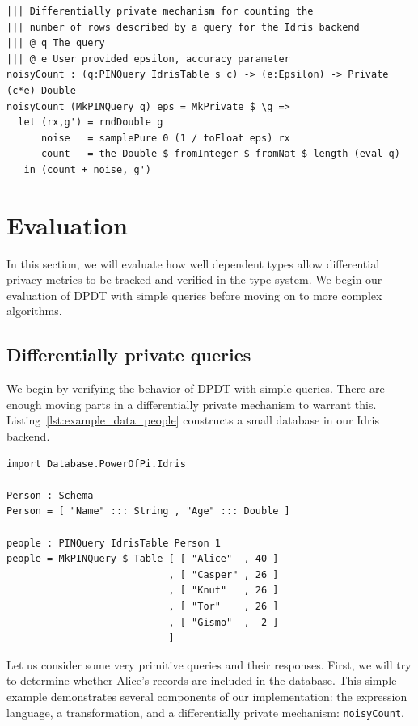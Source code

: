 \documentclass[12pt]{article}
\begin{document}
\begin{lstlisting}[caption={Representing aggregations},label={lst:aggregations}]
||| Differentially private mechanism for counting the
||| number of rows described by a query for the Idris backend
||| @ q The query
||| @ e User provided epsilon, accuracy parameter
noisyCount : (q:PINQuery IdrisTable s c) -> (e:Epsilon) -> Private (c*e) Double
noisyCount (MkPINQuery q) eps = MkPrivate $ \g =>
  let (rx,g') = rndDouble g
      noise   = samplePure 0 (1 / toFloat eps) rx
      count   = the Double $ fromInteger $ fromNat $ length (eval q)
   in (count + noise, g')
\end{lstlisting}

\section{Evaluation}\label{sec:evaluation}

In this section, we will evaluate how well dependent types allow differential privacy metrics to be tracked and verified in the type system.
We begin our evaluation of DPDT with simple queries before moving on to more complex algorithms.

\subsection{Differentially private queries}

We begin by verifying the behavior of DPDT with simple queries.
There are enough moving parts in a differentially private mechanism to warrant this.
Listing~\ref{lst:example_data_people} constructs a small database in our Idris backend.

\begin{lstlisting}[caption={Validation Data},label={lst:example_data_people}]
import Database.PowerOfPi.Idris

Person : Schema
Person = [ "Name" ::: String , "Age" ::: Double ]

people : PINQuery IdrisTable Person 1
people = MkPINQuery $ Table [ [ "Alice"  , 40 ]
                            , [ "Casper" , 26 ]
                            , [ "Knut"   , 26 ]
                            , [ "Tor"    , 26 ]
                            , [ "Gismo"  ,  2 ]
                            ]
\end{lstlisting}

Let us consider some very primitive queries and their responses.
First, we will try to determine whether Alice's records are included in the database.
This simple example demonstrates several components of our implementation: the expression language, a transformation, and a differentially private mechanism: \texttt{noisyCount}.
\end{document}
